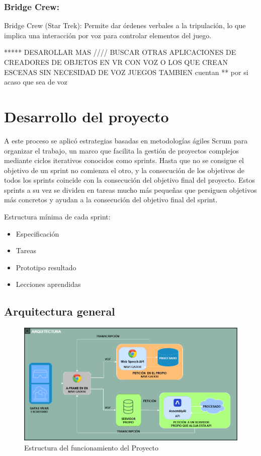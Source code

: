 \documentclass[a4paper, 12pt]{book}
\let\cleardoublepage\clearpage
\begin{document}
\subsection{Bridge Crew:}
Bridge Crew (Star Trek): Permite dar órdenes verbales a la tripulación, lo que implica una interacción por voz para controlar elementos del juego.

***** DESAROLLAR MAS
//// BUSCAR OTRAS APLICACIONES DE CREADORES DE OBJETOS EN VR CON VOZ O LOS QUE CREAN ESCENAS SIN NECESIDAD DE VOZ
JUEGOS TAMBIEN cuentan ** por si acaso que sea de voz 

\cleardoublepage

\chapter{Desarrollo del proyecto}
\label{chap:Desarollo}
 A este proceso se aplicó estrategias basadas en metodologías ágiles Scrum para organizar el trabajo, un marco que facilita la gestión de proyectos complejos mediante ciclos iterativos conocidos como sprints.  Hasta que no se consigue el objetivo de un sprint no comienza el otro, y la consecución de los objetivos de todos los sprints coincide con la consecución del objetivo final del proyecto. Estos sprints a su vez se dividen en tareas mucho más pequeñas que persiguen objetivos más concretos y ayudan a la consecución del objetivo final del sprint.

Estructura mínima de cada sprint:
\begin{itemize}
\item Especificación
\item Tareas
\item Prototipo resultado
\item Lecciones aprendidas
\end{itemize}

\section{Arquitectura general} 
\label{sec:arquitectura}


\begin{figure}[H]
  \centering
  \includegraphics[width=14cm, keepaspectratio]{img/Arquitectura.png}
  \caption{Estructura del funcionamiento del Proyecto}
  \label{fig:arquitectura}
\end{figure}
\end{document}
